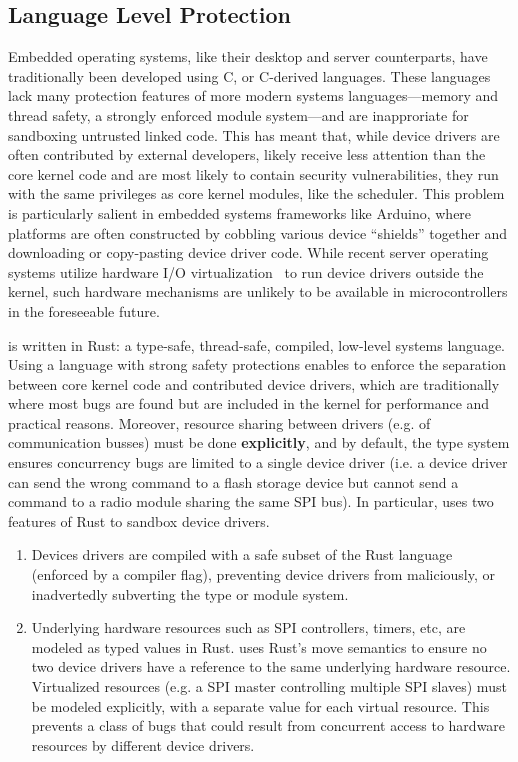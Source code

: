 \subsection{Language Level Protection}

Embedded operating systems, like their desktop and server counterparts, have
traditionally been developed using C, or C-derived languages. These languages
lack many protection features of more modern systems languages---memory and
thread safety, a strongly enforced module system---and are inapproriate for
sandboxing untrusted linked code. This has meant that, while device drivers are
often contributed by external developers, likely receive less attention than the
core kernel code and are most likely to contain security vulnerabilities, they
run with the same privileges as core kernel modules, like the scheduler. This
problem is particularly salient in embedded systems frameworks like Arduino,
where platforms are often constructed by cobbling various device ``shields''
together and downloading or copy-pasting device driver code. While recent server
operating systems utilize hardware I/O virtualization~\cite{arrakis:osdi2014,
ix:osdi2014} to run device drivers outside the kernel, such hardware mechanisms
are unlikely to be available in microcontrollers in the foreseeable future.

\name is written in Rust: a type-safe, thread-safe, compiled, low-level systems
language. Using a language with strong safety protections enables \name to
enforce the separation between core kernel code and contributed device
drivers, which are traditionally where most bugs are found but are included in
the kernel for performance and practical reasons. Moreover, resource sharing
between drivers (e.g. of communication busses) must be done {\bf explicitly}, and
by default, the type system ensures concurrency bugs are limited to a single
device driver (i.e. a device driver can send the wrong command to a flash
storage device but cannot send a command to a radio module sharing the same SPI
bus). In particular, \name uses two features of Rust to sandbox device drivers.

\begin{enumerate}
  \item Devices drivers are compiled with a safe subset of the Rust language
  (enforced by a compiler flag), preventing device drivers from maliciously, or
  inadvertedly subverting the type or module system.

  \item Underlying hardware resources such as SPI controllers, timers, etc, are
    modeled as typed values in Rust. \name uses Rust's move semantics to ensure
    no two device drivers have a reference to the same underlying hardware
    resource. Virtualized resources (e.g. a SPI master controlling multiple SPI
    slaves) must be modeled explicitly, with a separate value for each virtual
    resource. This prevents a class of bugs that could result from concurrent
    access to hardware resources by different device drivers.

\end{enumerate} 

